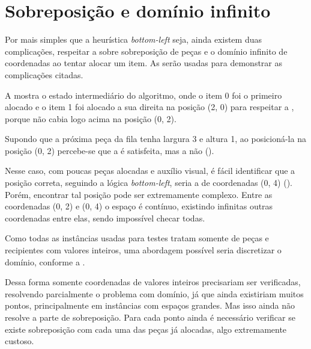 \section{Sobreposição e domínio infinito}\label{sec:sobreposicao-e-dominio-infinito}

Por mais simples que a heurística \textit{bottom-left} seja, ainda existem duas complicações,
respeitar a  sobre sobreposição de peças e o domínio infinito de coordenadas
ao tentar alocar um item.
As  serão usadas para
demonstrar as complicações citadas.

A  mostra o estado intermediário do algoritmo, onde o item 0
foi o primeiro alocado e o item 1 foi alocado a sua direita na posição (2, 0) para respeitar
a , porque não cabia logo acima na posição (0, 2).




Supondo que a próxima peça da fila tenha largura 3 e altura 1, ao posicioná-la na posição (0, 2)
percebe-se que a  é satisfeita, mas a  não ().



Nesse caso, com poucas peças alocadas e auxílio visual, é fácil identificar que a posição correta,
seguindo a lógica \textit{bottom-left}, seria a de coordenadas (0, 4)
().
Porém, encontrar tal posição pode ser extremamente complexo.
Entre as coordenadas (0, 2) e (0, 4) o espaço é contínuo, existindo infinitas outras coordenadas
entre elas, sendo impossível checar todas.



Como todas as instâncias usadas para testes tratam somente de peças e recipientes com valores
inteiros, uma abordagem possível seria discretizar o domínio, conforme a
.



Dessa forma somente coordenadas de valores inteiros precisariam ser verificadas, resolvendo
parcialmente o problema com domínio, já que ainda existiriam muitos pontos, principalmente em
instâncias com espaços grandes.
Mas isso ainda não resolve a parte de sobreposição.
Para cada ponto ainda é necessário verificar se existe sobreposição com cada uma das peças já
alocadas, algo extremamente custoso.

